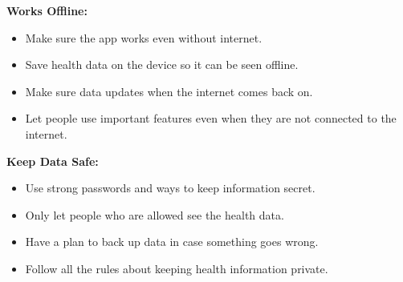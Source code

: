 \textbf{Works Offline:}
\begin{itemize}
    \item Make sure the app works even without internet.
    \item Save health data on the device so it can be seen offline.
    \item Make sure data updates when the internet comes back on.
    \item Let people use important features even when they are not connected to the internet.
\end{itemize}
\textbf{Keep Data Safe:}
\begin{itemize}
    \item Use strong passwords and ways to keep information secret.
    \item Only let people who are allowed see the health data.
    \item Have a plan to back up data in case something goes wrong.
    \item Follow all the rules about keeping health information private.
\end{itemize}
